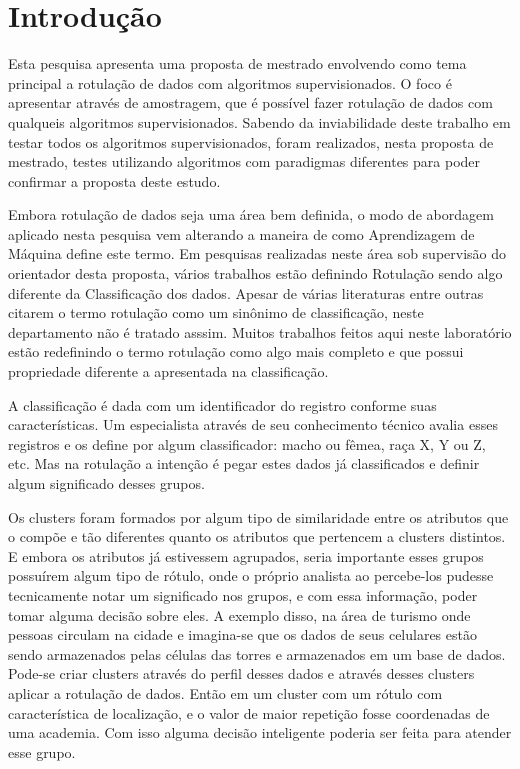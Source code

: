 
\chapter*[Introdução]{Introdução}

Esta pesquisa apresenta uma proposta de mestrado envolvendo como tema principal a rotulação de dados com algoritmos supervisionados. O foco é apresentar através de amostragem, que é possível fazer rotulação de dados com qualqueis algoritmos supervisionados. Sabendo da inviabilidade deste trabalho em  testar todos os algoritmos supervisionados, foram realizados, nesta proposta de mestrado, testes utilizando algoritmos com paradigmas diferentes para poder confirmar a proposta deste estudo.

Embora rotulação de dados seja uma área bem definida, o modo de abordagem aplicado nesta pesquisa vem alterando a maneira de como Aprendizagem de Máquina define este termo. Em pesquisas realizadas neste área sob supervisão do orientador desta proposta, vários trabalhos estão definindo Rotulação sendo algo diferente da Classificação dos dados. Apesar de várias literaturas \cite{Barber2011,Mitchell1997} entre outras citarem o termo rotulação como um sinônimo de classificação, neste departamento não é tratado asssim. Muitos trabalhos feitos aqui neste laboratório estão redefinindo o termo rotulação como algo mais completo e que possui propriedade diferente a apresentada na classificação.

A classificação é dada com um identificador do registro conforme suas características. Um especialista através de seu conhecimento técnico avalia esses registros e os define por algum classificador: macho ou fêmea, raça X, Y ou Z, etc. Mas na rotulação a intenção é pegar estes dados já classificados e definir algum significado desses grupos. 

Os clusters foram formados por algum tipo de similaridade entre os atributos que o compõe e tão diferentes quanto os atributos que pertencem a  clusters distintos. E embora os atributos já estivessem agrupados, seria importante esses grupos possuírem algum tipo de rótulo, onde o próprio analista ao percebe-los pudesse tecnicamente notar um significado nos grupos, e com essa informação, poder tomar alguma decisão sobre eles. A exemplo disso, na área de turismo onde pessoas circulam na cidade e imagina-se que os dados de seus celulares estão sendo armazenados pelas células das torres e armazenados em um base de dados. Pode-se criar clusters através do perfil desses dados e através desses clusters aplicar a rotulação de dados. Então em um cluster com um rótulo com característica de  localização, e o valor de maior repetição fosse coordenadas de uma academia. Com isso alguma decisão inteligente poderia ser feita para atender esse grupo. 

